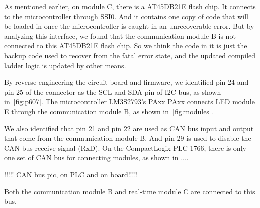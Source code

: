 As mentioned earlier, on module C, there is a AT45DB21E flash chip. It connects to the microcontroller through SSI0. And it contains one copy of code that will be loaded in once the microcontroller is caught in an unrecoverable error. But by analyzing this interface, we found that the communication module B is not connected to this AT45DB21E flash chip. So we think the code in it is just the backup code used to recover from the fatal error state, and the updated compiled ladder logic is updated by other means.  

By reverse engineering the circuit board and firmware, we identified pin 24 and pin 25 of the connector as the SCL and SDA pin of I2C bus, as shown in~\autoref{fig:p607}. The microcontroller LM3S2793's PAxx PAxx connects LED module E through the communication module B, as shown in~\autoref{fig:modules}.

We also identified that pin 21 and pin 22 are used as CAN bus input and output that come from the communication module B. And pin 29 is used to disable the CAN bus receive signal (RxD). On the CompactLogix PLC 1766, there is only one set of CAN bus for connecting modules, as shown in ....

!!!!! CAN bus pic, on PLC and on board!!!!!

Both the communication module B and real-time module C are connected to this bus.
